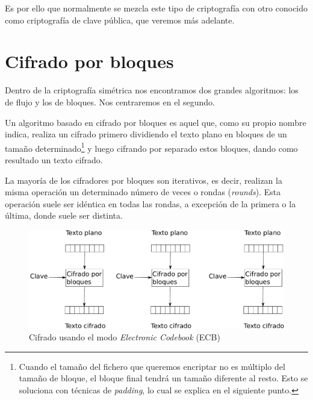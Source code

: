 Es por ello que normalmente se mezcla este tipo de criptografía con otro conocido como criptografía de clave pública, que veremos más adelante.


\section{Cifrado por bloques}

Dentro de la criptografía simétrica nos encontramos dos grandes algoritmos: los de flujo y los de bloques. Nos centraremos en el segundo.

Un algoritmo basado en cifrado por bloques es aquel que, como su propio nombre indica, realiza un cifrado primero dividiendo el texto plano en bloques de un tamaño determinado\footnote{Cuando el tamaño del fichero que queremos encriptar no es múltiplo del tamaño de bloque, el bloque final tendrá un tamaño diferente al resto. Esto se soluciona con técnicas de \emph{padding}, lo cual se explica en el siguiente punto.} y luego cifrando por separado estos bloques, dando como resultado un texto cifrado.

La mayoría de los cifradores por bloques son iterativos, es decir, realizan la misma operación un determinado número de veces o rondas (\emph{rounds}). Esta operación suele ser idéntica en todas las rondas, a excepción de la primera o la última, donde suele ser distinta.

\begin{figure}[ht]
  \centering
  \includegraphics[scale=0.5]{Figures/ECB}
  \decoRule
  \caption[\emph{Electronic Codebook} (ECB)]{Cifrado usando el modo \emph{Electronic Codebook} (ECB)}
  \label{fig:ECB}
\end{figure}


